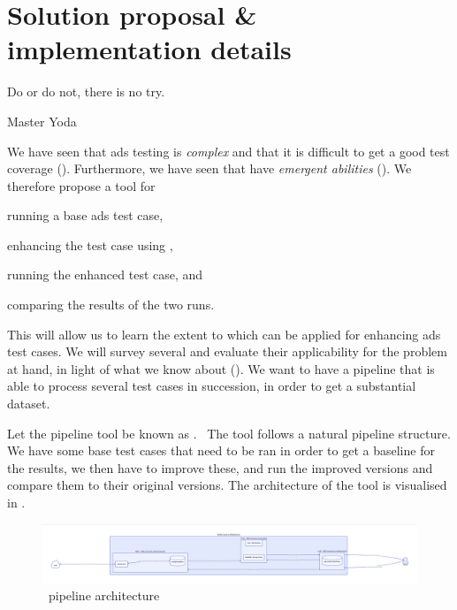 \chapter{Solution proposal \& implementation details}\label{sec:solutionProposal}

\epigraph{Do or do not, there is no try.}{Master Yoda}

We have seen that \acrshort{ads} testing is \textit{complex} and that it is difficult to get a good
test coverage (). Furthermore, we have seen that 
have \textit{emergent abilities} (). We therefore propose a tool for
\begin{inparaenum}
    \item running a base \acrshort{ads} test case,
    \item enhancing the test case using ,
    \item running the enhanced test case, and
    \item comparing the results of the two runs.
\end{inparaenum}

This will allow us to learn the extent to which  can be applied for enhancing
\acrlong{ads} test cases. We will survey several  and evaluate their applicability
for the problem at hand, in light of what we know about  (). We
want to have a pipeline that is able to process several test cases in succession, in order to get a
substantial dataset.

Let the pipeline tool be known as \hefe.~%
The tool follows a natural pipeline structure. We have some base test cases that
need to be ran in order to get a baseline for the results, we then have to
improve these, and run the improved versions and compare them to their original
versions. The architecture of the tool is visualised in .

\begin{figure}[h]
    \centering
    \includegraphics[width=\textwidth]{figures/d2-pdf/hefe.pdf}
    \caption{\hefe~pipeline architecture}\label{fig:hefeArch}
\end{figure}


